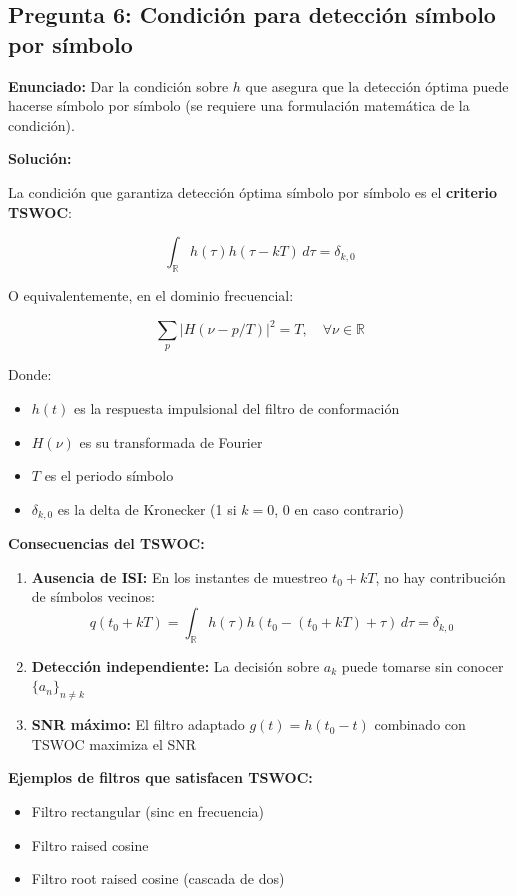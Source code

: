 \documentclass[11pt,a4paper]{article}
\begin{document}
\subsection*{Pregunta 6: Condici\'on para detecci\'on s\'imbolo por s\'imbolo}

\textbf{Enunciado:} Dar la condici\'on sobre $h$ que asegura que la detecci\'on \'optima puede hacerse s\'imbolo por s\'imbolo (se requiere una formulaci\'on matem\'atica de la condici\'on).

\vspace{0.3cm}
\textbf{Soluci\'on:}

La condici\'on que garantiza detecci\'on \'optima s\'imbolo por s\'imbolo es el \textbf{criterio TSWOC}:

\[
\boxed{\int_{\mathbb{R}} h(\tau)h(\tau - kT)\, d\tau = \delta_{k,0}}
\]

O equivalentemente, en el dominio frecuencial:

\[
\boxed{\sum_p |H(\nu - p/T)|^2 = T, \quad \forall \nu \in \mathbb{R}}
\]

Donde:
\begin{itemize}
    \item $h(t)$ es la respuesta impulsional del filtro de conformaci\'on
    \item $H(\nu)$ es su transformada de Fourier
    \item $T$ es el periodo s\'imbolo
    \item $\delta_{k,0}$ es la delta de Kronecker (1 si $k=0$, 0 en caso contrario)
\end{itemize}

\textbf{Consecuencias del TSWOC:}

\begin{enumerate}
    \item \textbf{Ausencia de ISI:} En los instantes de muestreo $t_0 + kT$, no hay contribuci\'on de s\'imbolos vecinos:
    \[
    q(t_0 + kT) = \int_{\mathbb{R}} h(\tau)h(t_0 - (t_0 + kT) + \tau)\, d\tau = \delta_{k,0}
    \]
    
    \item \textbf{Detecci\'on independiente:} La decisi\'on sobre $a_k$ puede tomarse sin conocer $\{a_n\}_{n \neq k}$
    
    \item \textbf{SNR m\'aximo:} El filtro adaptado $g(t) = h(t_0 - t)$ combinado con TSWOC maximiza el SNR
\end{enumerate}

\textbf{Ejemplos de filtros que satisfacen TSWOC:}
\begin{itemize}
    \item Filtro rectangular (sinc en frecuencia)
    \item Filtro raised cosine
    \item Filtro root raised cosine (cascada de dos)
\end{itemize}
\end{document}
